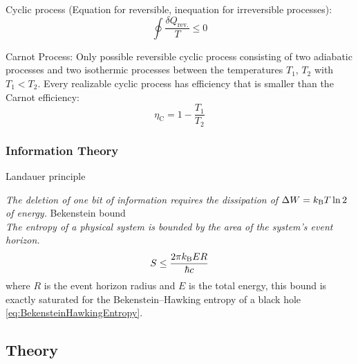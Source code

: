 			\noindent
			Cyclic process (Equation for reversible, inequation for irreversible processes):
			\begin{equation}
				\oint \frac{\delta Q_\text{rev.}}{T} \le 0
			\end{equation}

			\noindent
			Carnot Process:
			Only possible reversible cyclic process consisting of two adiabatic processes and two isothermic processes between the temperatures $T_1$, $T_2$ with $T_1 < T_2$. Every realizable cyclic process has efficiency that is smaller than the Carnot efficiency:
			\begin{equation}
				\eta_\text{C} = 1-\frac{T_1}{T_2}
			\end{equation}

		\subsubsection{Information Theory}
			Landauer principle

			\indent \emph{The deletion of one bit of information requires the dissipation of $\Delta W = k_{\text{B}} T \ln 2$ of energy.}\nl
			\noindent
			Bekenstein bound \\
			\indent \emph{The entropy of a physical system is bounded by the area of the system's event horizon.}
			\begin{equation}
				S \le \frac{2\pi k_{\text{B}} E R}{\hbar c}
			\end{equation}
			where $R$ is the event horizon radius and $E$ is the total energy, this bound is exactly saturated for the Bekenstein--Hawking entropy of a black hole \ref{eq:BekensteinHawkingEntropy}.

	\subsection{Theory}
